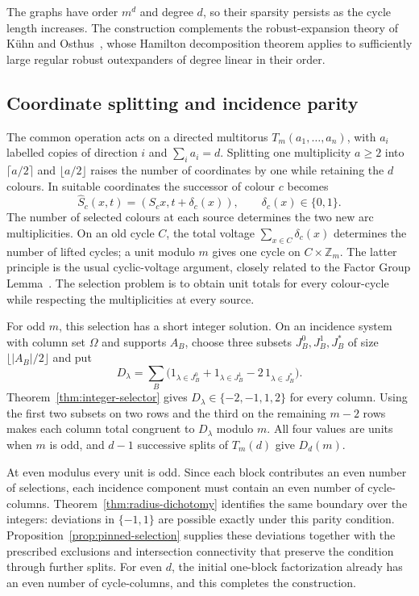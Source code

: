 \documentclass[11pt,reqno]{amsart}
\numberwithin{equation}{section}
\theoremstyle{definition}
\theoremstyle{remark}
\newcommand{\Zm}{\mathbb Z_m}
\newcommand{\cO}{\Omega}
\begin{document}
The graphs have order $m^d$ and degree $d$, so their sparsity persists
as the cycle length increases. The construction complements the
robust-expansion theory of K\"uhn and Osthus~\cite{KO13}, whose
Hamilton decomposition theorem applies to sufficiently large regular
robust outexpanders of degree linear in their order.

\subsection{Coordinate splitting and incidence parity}
The common operation acts on a directed multitorus
$T_m(a_1,\ldots,a_n)$, with $a_i$ labelled copies of direction $i$ and
$\sum_i a_i=d$. Splitting one multiplicity $a\ge2$ into
$\lceil a/2\rceil$ and $\lfloor a/2\rfloor$ raises the number of coordinates
by one while retaining the $d$ colours. In suitable coordinates the
successor of colour $c$ becomes
\[
 \widehat S_c(x,t)=(S_cx,t+\delta_c(x)),\qquad \delta_c(x)\in\{0,1\}.
\]
The number of selected colours at each source determines the two new
arc multiplicities. On an old cycle $C$, the total voltage
$\sum_{x\in C}\delta_c(x)$ determines the number of lifted cycles; a unit
modulo $m$ gives one cycle on $C\times\Zm$. The latter principle is the
usual cyclic-voltage argument, closely related to the Factor Group
Lemma~\cite[Lemma~9.11]{CW85}. The selection problem is to obtain unit
totals for every colour-cycle while respecting the multiplicities at
every source.

For odd $m$, this selection has a short integer solution. On an incidence
system with column set $\cO$ and supports $A_B$, choose three subsets
$J_B^0,J_B^1,J_B^*$ of size $\lfloor|A_B|/2\rfloor$ and put
\[
 D_\lambda=\sum_B\bigl(1_{\lambda\in J_B^0}
                 +1_{\lambda\in J_B^1}-2\,1_{\lambda\in J_B^*}\bigr).
\]
Theorem~\ref{thm:integer-selector} gives
$D_\lambda\in\{-2,-1,1,2\}$ for every column. Using the first two subsets
on two rows and the third on the remaining $m-2$ rows makes each column
total congruent to $D_\lambda$ modulo $m$. All four values are units when
$m$ is odd, and $d-1$ successive splits of $T_m(d)$ give $D_d(m)$.

At even modulus every unit is odd. Since each block contributes an even
number of selections, each incidence component must contain an even
number of cycle-columns. Theorem~\ref{thm:radius-dichotomy} identifies the
same boundary over the integers: deviations in $\{-1,1\}$ are possible
exactly under this parity condition. Proposition~\ref{prop:pinned-selection} supplies
these deviations together with the prescribed exclusions and
intersection connectivity that preserve the condition through further
splits. For even $d$, the initial one-block factorization already has an
even number of cycle-columns, and this completes the construction.
\end{document}
